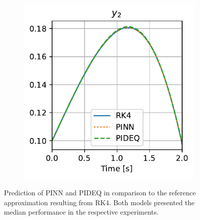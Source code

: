 \begin{figure}[h]
\begin{subfigure}[t]{.45\textwidth}
	\includegraphics{images/final_vdp_y2.pdf}
	\caption{}
    \end{subfigure}
    \caption{Prediction of \gls{PINN} and \gls{PIDEQ} in comparison to the reference approximation resulting from \gls{RK4}. Both models presented the median performance in the respective experiments.}
    \label{fig:final-vdp}
\end{figure}

